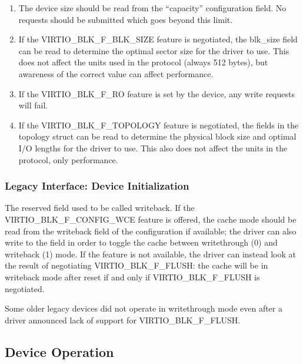 \begin{enumerate}
\item The device size should be read from the “capacity”
  configuration field. No requests should be submitted which goes
  beyond this limit.

\item If the VIRTIO_BLK_F_BLK_SIZE feature is negotiated, the
  blk_size field can be read to determine the optimal sector size
  for the driver to use. This does not affect the units used in
  the protocol (always 512 bytes), but awareness of the correct
  value can affect performance.

\item If the VIRTIO_BLK_F_RO feature is set by the device, any write
  requests will fail.

\item If the VIRTIO_BLK_F_TOPOLOGY feature is negotiated, the fields in the
  topology struct can be read to determine the physical block size and optimal
  I/O lengths for the driver to use. This also does not affect the units
  in the protocol, only performance.
\end{enumerate}

\subsubsection{Legacy Interface: Device Initialization}\label{sec:Device Types / Block Device / Device Initialization / Legacy Interface: Device Initialization}

The reserved field used to be called writeback.  If the
VIRTIO_BLK_F_CONFIG_WCE feature is offered, the cache mode should be
read from the writeback field of the configuration if available; the
driver can also write to the field in order to toggle the cache
between writethrough (0) and writeback (1) mode.  If the feature is
not available, the driver can instead look at the result of
negotiating VIRTIO_BLK_F_FLUSH: the cache will be in writeback mode
after reset if and only if VIRTIO_BLK_F_FLUSH is negotiated.

Some older legacy devices did not operate in writethrough mode even
after a driver announced lack of support for VIRTIO_BLK_F_FLUSH.

\subsection{Device Operation}\label{sec:Device Types / Block Device / Device Operation}

